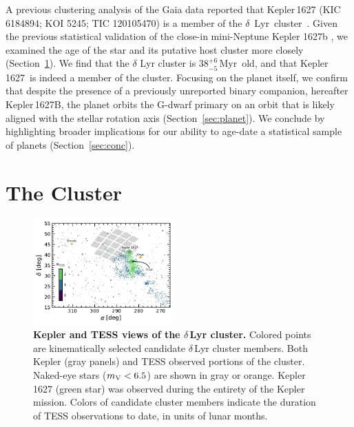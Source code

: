 \documentclass[12pt,modern,twocolumn,tighten]{aastex63}
\newcommand{\cn}{$\delta$\ Lyr\ cluster} %
\newcommand{\sn}{Kepler\,1627} %
\newcommand{\clusterage}{$38^{+6}_{-5}$\,Myr} %
\begin{document}
A previous clustering analysis of the Gaia data reported that
Kepler\,1627 (KIC 6184894; KOI 5245; TIC 120105470) is a member of the
\cn\ \citep{kounkel_untangling_2019}.  Given the previous statistical
validation of the close-in mini-Neptune Kepler 1627b
\citep{2012ApJS..199...24T,morton_false_2016,thompson_planetary_2018},
we examined the age of the star and its putative host cluster more
closely (Section~\ref{sec:cluster}).  We find that the $\delta$ Lyr
cluster is \clusterage\ old, and that \sn\ is indeed a member of the
cluster.  Focusing on the planet itself, we confirm that despite the
presence of a previously unreported binary companion, hereafter
Kepler\,1627B, the planet orbits the G-dwarf primary on an orbit that
is likely aligned with the stellar rotation axis
(Section~\ref{sec:planet}).  We conclude by highlighting broader
implications for our ability to age-date a statistical sample of
planets (Section~\ref{sec:conc}).


\section{The Cluster}
\label{sec:cluster}

\begin{figure}[t]
	\begin{center}
		\leavevmode
		\includegraphics[width=0.48\textwidth]{f2.pdf}
	\end{center}
	\vspace{-0.7cm}
	\caption{
    {\bf Kepler and TESS views of the $\delta$\,Lyr cluster.} Colored
    points are kinematically selected candidate $\delta$\,Lyr
    cluster members.  Both Kepler (gray panels) and TESS observed portions of
    the cluster.  Naked-eye stars ($m_{\rm V}<6.5$) are shown in gray or orange.
    Kepler\,1627 (green star) was observed during the entirety of the
    Kepler mission.  Colors of candidate cluster members indicate the
    duration of TESS observations to date, in units of lunar months.
    \label{fig:skychart}
	}
\end{figure}
\end{document}
